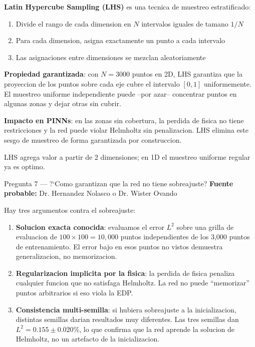 \begin{answerbox}
\textbf{Latin Hypercube Sampling (LHS)} es una tecnica de muestreo estratificado:
\begin{enumerate}
  \item Divide el rango de cada dimension en $N$ intervalos iguales de tamano $1/N$
  \item Para cada dimension, asigna exactamente un punto a cada intervalo
  \item Las asignaciones entre dimensiones se mezclan aleatoriamente
\end{enumerate}

\textbf{Propiedad garantizada}: con $N = 3000$ puntos en 2D, LHS garantiza que
la proyeccion de los puntos sobre cada eje cubre el intervalo $[0,1]$ uniformemente.
El muestreo uniforme independiente puede --por azar-- concentrar puntos en algunas
zonas y dejar otras sin cubrir.

\textbf{Impacto en PINNs}: en las zonas sin cobertura, la perdida de fisica no
tiene restricciones y la red puede violar Helmholtz sin penalizacion. LHS elimina
este sesgo de muestreo de forma garantizada por construccion.

LHS agrega valor a partir de 2 dimensiones; en 1D el muestreo uniforme regular
ya es optimo.
\end{answerbox}

\vspace{8pt}

\begin{qabox}{Pregunta 7 --- ?`Como garantizan que la red no tiene sobreajuste?}
\textbf{Fuente probable:} Dr. Hernandez Nolasco o Dr. Wister Ovando
\end{qabox}

\begin{answerbox}
Hay tres argumentos contra el sobreajuste:

\begin{enumerate}
  \item \textbf{Solucion exacta conocida}: evaluamos el error $L^2$ sobre una grilla
        de evaluacion de $100 \times 100 = 10{,}000$ puntos independientes de los
        3,000 puntos de entrenamiento. El error bajo en esos puntos no vistos demuestra
        generalizacion, no memorizacion.

  \item \textbf{Regularizacion implicita por la fisica}: la perdida de fisica penaliza
        cualquier funcion que no satisfaga Helmholtz. La red no puede ``memorizar''
        puntos arbitrarios si eso viola la EDP.

  \item \textbf{Consistencia multi-semilla}: si hubiera sobreajuste a la inicializacion,
        distintas semillas darian resultados muy diferentes. Las tres semillas dan
        $L^2 = 0.155 \pm 0.020\%$, lo que confirma que la red aprende la solucion
        de Helmholtz, no un artefacto de la inicializacion.
\end{enumerate}
\end{answerbox}

